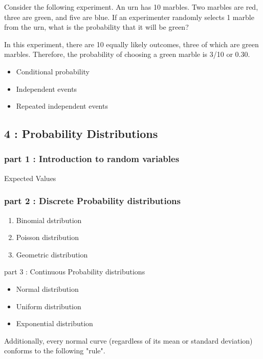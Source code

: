 \documentclass[]{report}
\begin{document}
Consider the following experiment. An urn has 10 marbles. Two marbles are red, three are green, and five are blue. If an experimenter randomly selects 1 marble from the urn, what is the probability that it will be green?

In this experiment, there are 10 equally likely outcomes, three of which are green marbles. Therefore, the probability of choosing a green marble is 3/10 or 0.30.
\begin{itemize}
	\item Conditional probability
	\item Independent events
	\item Repeated independent events
\end{itemize}

\newpage

\subsection{ 4 : Probability Distributions}

\subsubsection{part 1 : Introduction to random variables}
Expected Values

\subsubsection{part 2 : Discrete Probability distributions}




\begin{enumerate}
	\item Binomial dstribution
	\item Poisson distribution
	\item Geometric distribution
\end{enumerate}

part 3 :  Continuous Probability distributions



\begin{itemize}
	\item Normal distribution
	\item Uniform distribution
	\item Exponential distribution
\end{itemize}

Additionally, every normal curve (regardless of its mean or standard deviation) conforms to the following "rule".
\end{document}
